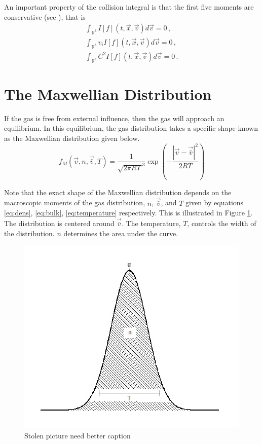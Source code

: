 \documentclass[12pt]{CSUNthesis}
\newcommand{\bulkv}{\vec{\bar{v}}} %
\begin{document}
An important property of the collision integral is that the first five moments are conservative (see \cite{Kremer2010}), that is
\begin{equation}
\label{eq:I_conservative}
\begin{split}
	\int_{\mathbb{R}^3}  I[f](t,\vec{x},\vec{v}) d\vec{v} = 0\, ,  \\
	\int_{\mathbb{R}^3} v_i I[f](t,\vec{x},\vec{v}) d\vec{v} = 0\, ,  \\
	\int_{\mathbb{R}^3} C^2 I[f](t,\vec{x},\vec{v}) d\vec{v} = 0 \, .
\end{split}
\end{equation}

\section{The Maxwellian Distribution}

If the gas is free from external influence, then the gas will approach an equilibrium. In this equilibrium, the gas distribution takes a specific shape known as the Maxwellian distribution given below.
\begin{equation}
\label{eq:maxwellian}
f_M(\vec{v},n,\vec{\bar{v}},T) = \frac{1}{\sqrt{2 \pi R T}^3} \exp\left( -\frac{ |\vec{v} - \vec{\bar{v}}|^2}{2RT} \right)
\end{equation} 
	
Note that the exact shape of the Maxwellian distribution depends on the macroscopic moments of the gas distribution, $n$, $\vec{\bar{v}}$, and $T$ given by equations \ref{eq:dens}, \ref{eq:bulk}, \ref{eq:temperature} respectively. This is illustrated in Figure \ref{fig:1d_maxwellian}. The distribution is centered around $\bulkv$. The temperature, $T$, controls the width of the distribution. $n$ determines the area under the curve.
\begin{figure}[h]
\centering
\includegraphics[scale=.5]{1D_Maxwellian}
\caption{Stolen picture need better caption}
\label{fig:1d_maxwellian}
\end{figure}
\end{document}
